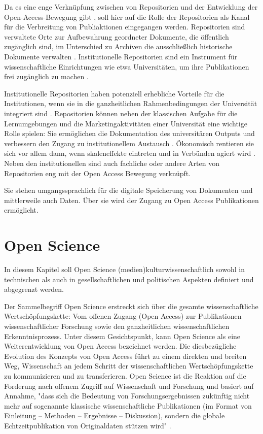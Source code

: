 Da es eine enge Verknüpfung zwischen von Repositorien und der Entwicklung der Open-Access-Bewegung gibt \cite{offhaus_2012_institutionelle_repos}, soll hier auf die Rolle der Repositorien als Kanal für die Verbreitung von Publiaktionen eingegangen werden. 
Repositorien sind verwaltete Orte zur Aufbewahrung geordneter Dokumente, die öffentlich zugänglich sind, im Unterschied zu Archiven die ausschließlich historische Dokumente verwalten \cite{suchen}. Institutionelle Repositorien sind ein Instrument für wissenschaftliche Einrichtungen wie etwa Universitäten, um ihre Publikationen frei zugänglich zu machen \cite{dobratz_2007_open}.

Institutionelle Repositorien haben potenziell erhebliche Vorteile für die Institutionen, wenn sie in die ganzheitlichen Rahmenbedingungen der Universität integriert sind \cite{steele_2006}. Repositorien können neben der klassischen Aufgabe für die Lernumgebungen und die Marketingaktivitäten einer Universität eine wichtige Rolle spielen: Sie ermöglichen die Dokumentation des universitären Outputs und verbessern den Zugang zu institutionellem Austausch \cite{steele_2006}. Ökonomisch rentieren sie sich vor allem dann, wenn skaleneffekte eintreten und in Verbünden agiert wird \cite{blythe_2005value}. Neben den institutionellen sind auch fachliche oder andere Arten von Repositorien eng mit der Open Access Bewegung verknüpft. 

Sie stehen umgangssprachlich für die digitale Speicherung von Dokumenten und mittlerweile auch Daten. Über sie wird der Zugang zu Open Access Publikationen ermöglicht.

\section{Open Science}
In diesem Kapitel soll Open Science (medien)kulturwissenschaftlich sowohl in technischen als auch in gesellschaftlichen und politischen Aspekten definiert und abgegrenzt werden.

Der Sammelbegriff Open Science erstreckt sich über die gesamte wissenschaftliche Wertschöpfungskette: Vom offenen Zugang (Open Access) zur Publikationen wissenschaftlicher Forschung sowie den ganzheitlichen wissenschaftlichen Erkenntnisprozess. Unter diesem Gesichtspunkt, kann Open Science als eine Weiterentwicklung von Open Access bezeichnet werden. Die diesbezügliche Evolution des Konzepts von Open Access führt zu einem direkten und breiten Weg, Wissenschaft an jedem Schritt der wissenschaftlichen Wertschöpfungskette zu kommunizieren und zu transferieren. Open Science ist die Reaktion auf die Forderung nach offenem Zugriff auf Wissenschaft und Forschung und basiert auf Annahme, "dass sich die Bedeutung von Forschungsergebnissen zukünftig nicht mehr auf sogenannte klassische wissenschaftliche Publikationen (im Format von Einleitung – Methoden – Ergebnisse – Diskussion), sondern die globale Echtzeitpublikation von Originaldaten stützen wird" \cite{Stengel_2013}.

